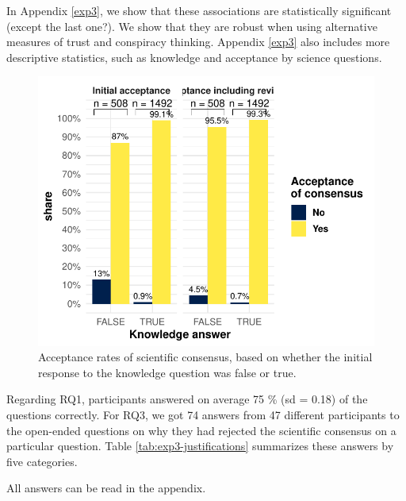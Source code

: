 \documentclass[
  doc,floatsintext]{apa6}
\begin{document}
In Appendix \ref{exp3}, we show that these associations are statistically significant (except the last one?). We show that they are robust when using alternative measures of trust and conspiracy thinking. Appendix \ref{exp3} also includes more descriptive statistics, such as knowledge and acceptance by science questions.



\begin{figure}
\centering
\includegraphics{output/figures/exp3-conditional-acceptance.pdf}
\caption{\label{fig:exp3-conditional-acceptance}Acceptance rates of scientific consensus, based on whether the initial response to the knowledge question was false or true.}
\end{figure}

Regarding RQ1, participants answered on average 75 \% (sd = 0.18) of the questions correctly. For RQ3, we got 74 answers from 47 different participants to the open-ended questions on why they had rejected the scientific consensus on a particular question. Table \ref{tab:exp3-justifications} summarizes these answers by five categories.

All answers can be read in the appendix.
\end{document}
